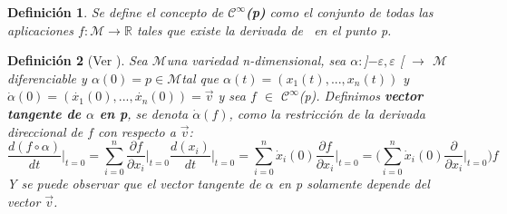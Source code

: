 \documentclass[pdftex,11pt,a4paper]{book}
\newtheorem{defi}{Definici\'on}
\newcommand{\M}{$\mathscr{M}$}
\newcommand{\Cinf}{ $\mathscr{C}^\infty$}
\newcommand{\f}{\textflorin \ }
\begin{document}
\begin{defi}
Se define el concepto de \textbf{$\mathscr{C}^\infty$(p)} como el conjunto de todas las aplicaciones $f:\mathscr{M} \to \mathbb{R}$  tales que existe la derivada de \f  en el punto p.
\end{defi}

\begin{defi}[Ver \cite{DoCarmoRiemann}]
Sea \M una variedad n-dimensional, sea $\alpha:$]$-\varepsilon, \varepsilon$ [ $\to$ \M  diferenciable y $\alpha (0) = p \in$\M tal que $\alpha(t) = (x_1(t), ...,x_n(t))$ y  $\dot{\alpha}(0) = (\dot{x_1}(0), ...,\dot{x_n}(0))= \vec{v}$ y sea $f$ $\in$ \Cinf(p). Definimos \textbf{vector tangente de $\alpha$ en p}, se denota $\dot{\alpha}(f)$, como la restricción de la derivada direccional de $f$ con respecto a $\vec{v}$:
\begin{equation}
\frac{ d(f \circ \alpha)}{dt}\bigg|_{t=0} = \sum_{i=0}^{n} \frac{\partial f}{\partial x_i}\bigg|_{t=0} \frac{d (x_i)}{dt}\bigg|_{t=0} = \sum_{i=0}^{n} \dot{x}_i(0)\frac{\partial f}{\partial x_i}\bigg|_{t=0} = 
 \bigg(\sum_{i=0}^{n} \dot{x}_i(0)\frac{\partial }{\partial x_i}\bigg|_{t=0}\bigg)f
\end{equation}
Y se puede observar que el vector tangente de $\alpha$ en p solamente depende del vector $\vec{v}$. 
\end{defi}
\end{document}
